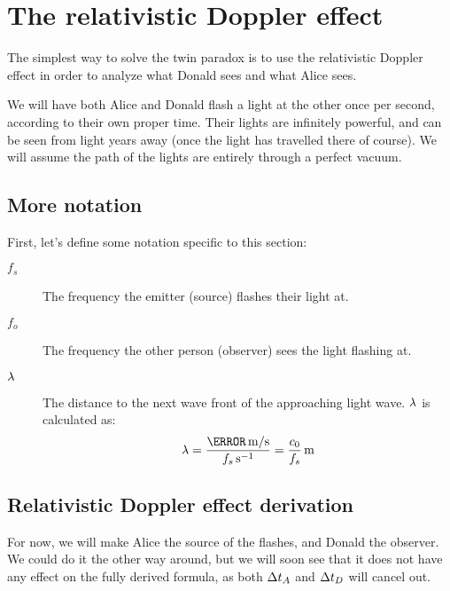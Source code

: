 \section{The relativistic Doppler effect}
	The simplest way to solve the twin paradox is to use the relativistic Doppler effect in order to analyze what Donald sees and what Alice sees.

	We will have both Alice and Donald flash a light at the other once per second, according to their own proper time.
	Their lights are infinitely powerful, and can be seen from light years away (once the light has travelled there of course).
	We will assume the path of the lights are entirely through a perfect vacuum.
	\subsection{More notation}
		First, let's define some notation specific to this section:
		\begin{description}
			\item[$f_s$] The frequency the emitter (source) flashes their light at.
			\item[$f_o$] The frequency the other person (observer) sees the light flashing at.
			\item[$\mathrm{\lambda}$] The distance to the next wave front of the approaching light wave. $\mathrm{\lambda}$ is calculated as:
			              \[\lam = \frac{\varSI{\clight}{\metre/\second}}{\varSI{f_s}{\per\second}} = \varSI{\frac{\si{\clight}}{f_s}}{\metre}\]
		\end{description}
	\subsection{Relativistic Doppler effect derivation}
		For now, we will make Alice the source of the flashes, and Donald the observer.
		We could do it the other way around, but we will soon see that it does not have any effect on the fully derived formula, as both $\mathrm{\Delta} t_A$ and $\mathrm{\Delta} t_D$ will cancel out.

